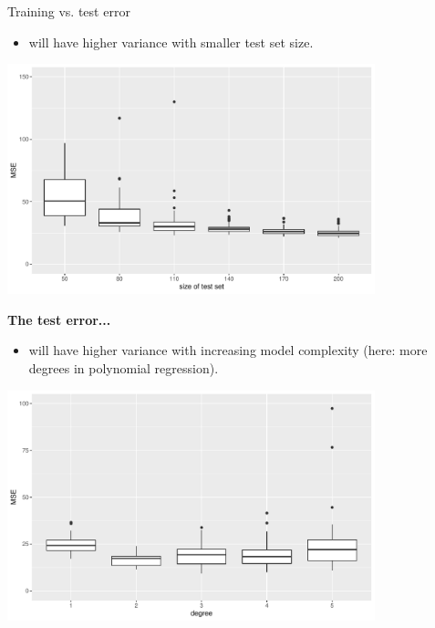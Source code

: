 \documentclass[11pt,compress,t,notes=noshow, xcolor=table]{beamer}
\begin{document}
\begin{vbframe}{Training vs. test error}
\begin{itemize}  
  
  \item will have higher variance with smaller test set size.

\end{itemize}
\begin{center}
\includegraphics[width=0.8\textwidth]{figure/fig-train-vs-test-error-3}
\end{center}  

\framebreak
\textbf{The test error...}

\begin{itemize}    
  
  \item will have higher variance with increasing model complexity (here: more degrees in polynomial regression).
\end{itemize}

\begin{center}
\includegraphics[width=0.8\textwidth]{figure/fig-train-vs-test-error-5}
\end{center} 

\end{vbframe}


\end{document}
